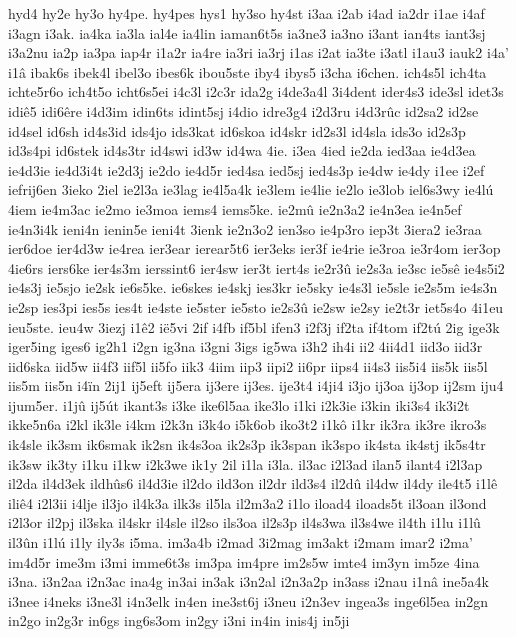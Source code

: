 {hyd4
hy2e
hy3o
hy4pe.
hy4pes
hys1
hy3so
hy4st
i3aa
i2ab
i4ad
ia2dr
i1ae
i4af
i3agn
i3ak.
ia4ka
ia3la
ial4e
ia4lin
iaman6t5s
ia3ne3
ia3no
i3ant
ian4ts
iant3sj
i3a2nu
ia2p
ia3pa
iap4r
i1a2r
ia4re
ia3ri
ia3rj
i1as
i2at
ia3te
i3atl
i1au3
iauk2
i4a'
i1â
ibak6s
ibek4l
ibel3o
ibes6k
ibou5ste
iby4
ibys5
i3cha
i6chen.
ich4s5l
ich4ta
ichte5r6o
ich4t5o
icht6s5ei
i4c3l
i2c3r
ida2g
i4de3a4l
3i4dent
ider4s3
ide3sl
idet3s
idiê5
idi6êre
i4d3im
idin6ts
idint5sj
i4dio
idre3g4
i2d3ru
i4d3rûc
id2sa2
id2se
id4sel
id6sh
id4s3id
ids4jo
ids3kat
id6skoa
id4skr
id2s3l
id4sla
ids3o
id2s3p
id3s4pi
id6stek
id4s3tr
id4swi
id3w
id4wa
4ie.
i3ea
4ied
ie2da
ied3aa
ie4d3ea
ie4d3ie
ie4d3i4t
ie2d3j
ie2do
ie4d5r
ied4sa
ied5sj
ied4s3p
ie4dw
ie4dy
i1ee
i2ef
iefrij6en
3ieko
2iel
ie2l3a
ie3lag
ie4l5a4k
ie3lem
ie4lie
ie2lo
ie3lob
iel6s3wy
ie4lú
4iem
ie4m3ac
ie2mo
ie3moa
iems4
iems5ke.
ie2mû
ie2n3a2
ie4n3ea
ie4n5ef
ie4n3i4k
ieni4n
ienin5e
ieni4t
3ienk
ie2n3o2
ien3so
ie4p3ro
iep3t
3iera2
ie3raa
ier6doe
ier4d3w
ie4rea
ier3ear
ierear5t6
ier3eks
ier3f
ie4rie
ie3roa
ie3r4om
ier3op
4ie6rs
iers6ke
ier4s3m
ierssint6
ier4sw
ier3t
iert4s
ie2r3û
ie2s3a
ie3sc
ie5sê
ie4s5i2
ie4s3j
ie5sjo
ie2sk
ie6s5ke.
ie6skes
ie4skj
ies3kr
ie5sky
ie4s3l
ie5sle
ie2s5m
ie4s3n
ie2sp
ies3pi
ies5s
ies4t
ie4ste
ie5ster
ie5sto
ie2s3û
ie2sw
ie2sy
ie2t3r
iet5s4o
4i1eu
ieu5ste.
ieu4w
3iezj
i1ê2
ië5vi
2if
i4fb
if5bl
ifen3
i2f3j
if2ta
if4tom
if2tú
2ig
ige3k
iger5ing
iges6
ig2h1
i2gn
ig3na
i3gni
3igs
ig5wa
i3h2
ih4i
ii2
4ii4d1
iid3o
iid3r
iid6ska
iid5w
ii4f3
iif5l
ii5fo
iik3
4iim
iip3
iipi2
ii6pr
iips4
ii4s3
iis5i4
iis5k
iis5l
iis5m
iis5n
i4ïn
2ij1
ij5eft
ij5era
ij3ere
ij3es.
ije3t4
i4ji4
i3jo
ij3oa
ij3op
ij2sm
iju4
ijum5er.
i1jû
ij5út
ikant3s
i3ke
ike6l5aa
ike3lo
i1ki
i2k3ie
i3kin
iki3s4
ik3i2t
ikke5n6a
i2kl
ik3le
i4km
i2k3n
i3k4o
i5k6ob
iko3t2
i1kô
i1kr
ik3ra
ik3re
ikro3s
ik4sle
ik3sm
ik6smak
ik2sn
ik4s3oa
ik2s3p
ik3span
ik3spo
ik4sta
ik4stj
ik5s4tr
ik3sw
ik3ty
i1ku
i1kw
i2k3we
ik1y
2il
i1la
i3la.
il3ac
i2l3ad
ilan5
ilant4
i2l3ap
il2da
il4d3ek
ildhûs6
il4d3ie
il2do
ild3on
il2dr
ild3s4
il2dû
il4dw
il4dy
ile4t5
i1lê
iliê4
i2l3ii
i4lje
il3jo
il4k3a
ilk3s
il5la
il2m3a2
i1lo
iload4
iloads5t
il3oan
il3ond
i2l3or
il2pj
il3ska
il4skr
il4sle
il2so
ils3oa
il2s3p
il4s3wa
il3s4we
il4th
i1lu
i1lû
il3ûn
i1lú
i1ly
ily3s
i5ma.
im3a4b
i2mad
3i2mag
im3akt
i2mam
imar2
i2ma'
im4d5r
ime3m
i3mi
imme6t3s
im3pa
im4pre
im2s5w
imte4
im3yn
im5ze
4ina
i3na.
i3n2aa
i2n3ac
ina4g
in3ai
in3ak
i3n2al
i2n3a2p
in3ass
i2nau
i1nâ
ine5a4k
i3nee
i4neks
i3ne3l
i4n3elk
in4en
ine3st6j
i3neu
i2n3ev
ingea3s
inge6l5ea
in2gn
in2go
in2g3r
in6gs
ing6s3om
in2gy
i3ni
in4in
inis4j
in5ji
}
